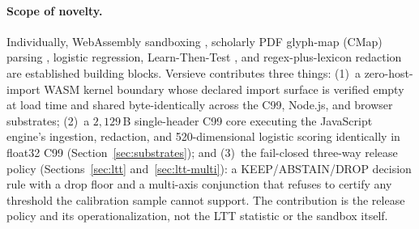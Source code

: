 \documentclass{article}
\begin{document}
\paragraph{Scope of novelty.}
Individually, WebAssembly sandboxing \citep{haas2017wasm}, scholarly PDF glyph-map (CMap) parsing \citep{lo2020s2orc}, logistic regression, Learn-Then-Test \citep{angelopoulos2021ltt}, and regex-plus-lexicon redaction \citep{presidio2021} are established building blocks. Versieve contributes three things: (1)~a zero-host-import WASM kernel boundary whose declared import surface is verified empty at load time and shared byte-identically across the C99, Node.js, and browser substrates; (2)~a $2{,}129$\,B single-header C99 core executing the JavaScript engine's ingestion, redaction, and 520-dimensional logistic scoring identically in float32 C99 (Section~\ref{sec:substrates}); and (3)~the fail-closed three-way release policy (Sections~\ref{sec:ltt} and~\ref{sec:ltt-multi}): a KEEP/ABSTAIN/DROP decision rule with a drop floor and a multi-axis conjunction that refuses to certify any threshold the calibration sample cannot support. The contribution is the release policy and its operationalization, not the LTT statistic or the sandbox itself.

\begin{table}[t]
\caption{Summary of Versieve capabilities, verified measurements, and explicit operating boundaries.}
\label{tab:scope}
\vskip 0.08in
\begin{center}
\end{center}
\vskip -0.14in
\end{table}
\end{document}
